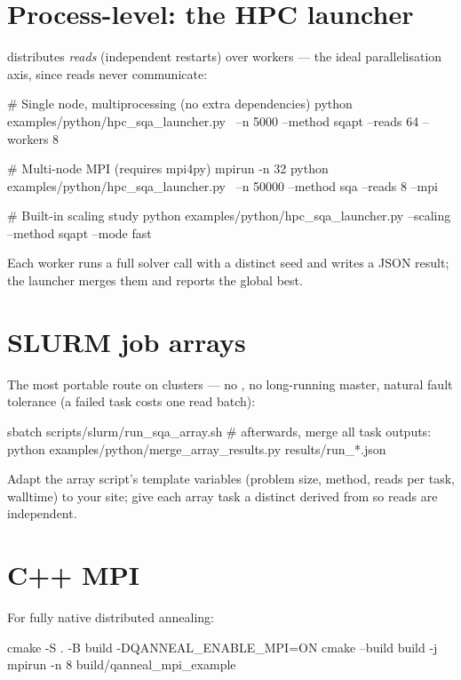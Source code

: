 \section{Process-level: the HPC launcher}

 distributes \emph{reads}
(independent restarts) over workers --- the ideal parallelisation axis, since
reads never communicate:

\begin{bashcode}
# Single node, multiprocessing (no extra dependencies)
python examples/python/hpc_sqa_launcher.py \
  --n 5000 --method sqapt --reads 64 --workers 8

# Multi-node MPI (requires mpi4py)
mpirun -n 32 python examples/python/hpc_sqa_launcher.py \
  --n 50000 --method sqa --reads 8 --mpi

# Built-in scaling study
python examples/python/hpc_sqa_launcher.py --scaling --method sqapt --mode fast
\end{bashcode}

Each worker runs a full solver call with a distinct seed and writes a JSON
result; the launcher merges them and reports the global best.

\section{SLURM job arrays}

The most portable route on clusters --- no , no long-running
master, natural fault tolerance (a failed task costs one read batch):

\begin{bashcode}
sbatch scripts/slurm/run_sqa_array.sh
# afterwards, merge all task outputs:
python examples/python/merge_array_results.py results/run_*.json
\end{bashcode}

Adapt the array script's template variables (problem size, method, reads per
task, walltime) to your site; give each array task a distinct
\code{--seed} derived from \code{\$SLURM\_ARRAY\_TASK\_ID} so reads are
independent.

\section{C++ MPI}

For fully native distributed annealing:

\begin{bashcode}
cmake -S . -B build -DQANNEAL_ENABLE_MPI=ON
cmake --build build -j
mpirun -n 8 build/qanneal_mpi_example
\end{bashcode}

